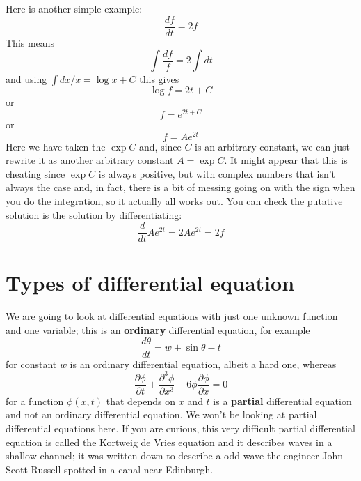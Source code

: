 \documentclass[12pt]{article}
\begin{document}
Here is another simple example:
\begin{equation}
  \frac{df}{dt}=2f
\end{equation}
This means
\begin{equation}
  \int\frac{df}{f}=2\int{}dt
\end{equation}
and using $\int dx/x=\log{x}+C$ this gives
\begin{equation}
  \log{f}=2t+C
\end{equation}
or
\begin{equation}
  f=e^{2t+C}
\end{equation}
or
\begin{equation}
  f=Ae^{2t}
\end{equation}
Here we have taken the $\exp{C}$ and, since $C$ is an arbitrary
constant, we can just rewrite it as another arbitrary constant
$A=\exp{C}$. It might appear that this is cheating since $\exp{C}$ is
always positive, but with complex numbers that isn't always the case
and, in fact, there is a bit of messing going on with the sign when
you do the integration, so it actually all works out. You can check the putative solution is the solution by differentiating:
\begin{equation}
  \frac{d}{dt}Ae^{2t}=2Ae^{2t}=2f
\end{equation}

\section*{Types of differential equation}
We are going to look at differential equations with just one unknown function and one variable; this is an \textbf{ordinary} differential equation, for example
\begin{equation}
  \frac{d\theta}{dt}=w+\sin{\theta-t}
\end{equation}
for constant $w$ is an ordinary differential equation, albeit a hard one, whereas
\begin{equation}
  \frac{\partial \phi}{\partial t}+\frac{\partial^3\phi}{\partial x^3}-6\phi\frac{\partial \phi}{\partial x}=0
\end{equation}
for a function $\phi(x,t)$ that depends on $x$ and $t$ is a
\textbf{partial} differential equation and not an ordinary
differential equation. We won't be looking at partial differential
equations here. If you are curious, this very difficult partial
differential equation is called the Kortweig de Vries equation and it
describes waves in a shallow channel; it was written down to describe
a odd wave the engineer John Scott Russell spotted in a canal near
Edinburgh.
\end{document}

